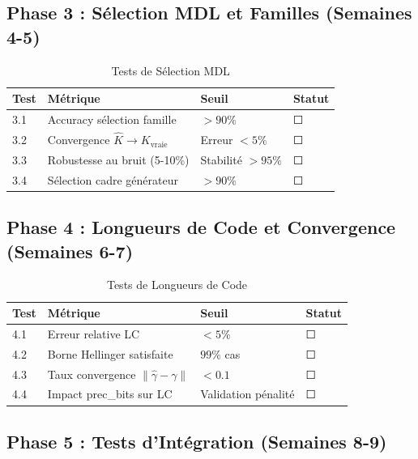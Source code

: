 \documentclass[12pt,a4paper]{article}
\begin{document}
	\subsection{Phase 3 : Sélection MDL et Familles (Semaines 4-5)}
	\label{subsec:phase3}
	
	\begin{table}[h]
		\centering
		\caption{Tests de Sélection MDL}
		\label{tab:tests_mdl}
		\begin{tabular}{@{}llll@{}}
			\toprule
			\textbf{Test} & \textbf{Métrique} & \textbf{Seuil} & \textbf{Statut} \\
			\midrule
			3.1 & Accuracy sélection famille & $> 90\%$ & ☐ \\
			3.2 & Convergence $\hat{K} \to K_{\text{vraie}}$ & Erreur $< 5\%$ & ☐ \\
			3.3 & Robustesse au bruit (5-10\%) & Stabilité $> 95\%$ & ☐ \\
			3.4 & Sélection cadre générateur & $> 90\%$ & ☐ \\
			\bottomrule
		\end{tabular}
	\end{table}
	
	\subsection{Phase 4 : Longueurs de Code et Convergence (Semaines 6-7)}
	\label{subsec:phase4}
	
	\begin{table}[h]
		\centering
		\caption{Tests de Longueurs de Code}
		\label{tab:tests_longueurs}
		\begin{tabular}{@{}llll@{}}
			\toprule
			\textbf{Test} & \textbf{Métrique} & \textbf{Seuil} & \textbf{Statut} \\
			\midrule
			4.1 & Erreur relative LC & $< 5\%$ & ☐ \\
			4.2 & Borne Hellinger satisfaite & $99\%$ cas & ☐ \\
			4.3 & Taux convergence $\|\hat{\gamma} - \gamma\|$ & $< 0.1$ & ☐ \\
			4.4 & Impact prec\_bits sur LC & Validation pénalité & ☐ \\
			\bottomrule
		\end{tabular}
	\end{table}
	
	\subsection{Phase 5 : Tests d'Intégration (Semaines 8-9)}
	\label{subsec:phase5}
	
\end{document}
